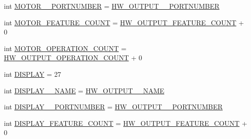 \begin{DoxyCompactItemize}
\item 
int \hyperlink{interfaceshootingmachineemfmodel_1_1_shootingmachineemfmodel_package_ad27731e242f79b59628ab647963d0eaf}{M\-O\-T\-O\-R\-\_\-\-\_\-\-P\-O\-R\-T\-N\-U\-M\-B\-E\-R} = \hyperlink{interfaceshootingmachineemfmodel_1_1_shootingmachineemfmodel_package_a2407c3a47af8c06cbb4aabb70268949d}{H\-W\-\_\-\-O\-U\-T\-P\-U\-T\-\_\-\-\_\-\-P\-O\-R\-T\-N\-U\-M\-B\-E\-R}
\item 
int \hyperlink{interfaceshootingmachineemfmodel_1_1_shootingmachineemfmodel_package_ad99b3e06abce5503e6e3ef77c5058b72}{M\-O\-T\-O\-R\-\_\-\-F\-E\-A\-T\-U\-R\-E\-\_\-\-C\-O\-U\-N\-T} = \hyperlink{interfaceshootingmachineemfmodel_1_1_shootingmachineemfmodel_package_aefdcd2b83d8884b60a471a861146421f}{H\-W\-\_\-\-O\-U\-T\-P\-U\-T\-\_\-\-F\-E\-A\-T\-U\-R\-E\-\_\-\-C\-O\-U\-N\-T} + 0
\item 
int \hyperlink{interfaceshootingmachineemfmodel_1_1_shootingmachineemfmodel_package_ace2679b1f358734d8936489db75b5a35}{M\-O\-T\-O\-R\-\_\-\-O\-P\-E\-R\-A\-T\-I\-O\-N\-\_\-\-C\-O\-U\-N\-T} = \hyperlink{interfaceshootingmachineemfmodel_1_1_shootingmachineemfmodel_package_a911c6904fe8043130ce479d0e1d2e0b6}{H\-W\-\_\-\-O\-U\-T\-P\-U\-T\-\_\-\-O\-P\-E\-R\-A\-T\-I\-O\-N\-\_\-\-C\-O\-U\-N\-T} + 0
\item 
int \hyperlink{interfaceshootingmachineemfmodel_1_1_shootingmachineemfmodel_package_a5192d9d2f65949d1265252867e80bb70}{D\-I\-S\-P\-L\-A\-Y} = 27
\item 
int \hyperlink{interfaceshootingmachineemfmodel_1_1_shootingmachineemfmodel_package_a285c9b72184c985918ffefe121eabcd9}{D\-I\-S\-P\-L\-A\-Y\-\_\-\-\_\-\-N\-A\-M\-E} = \hyperlink{interfaceshootingmachineemfmodel_1_1_shootingmachineemfmodel_package_a82c44c284e4ef61163abe3704089bfad}{H\-W\-\_\-\-O\-U\-T\-P\-U\-T\-\_\-\-\_\-\-N\-A\-M\-E}
\item 
int \hyperlink{interfaceshootingmachineemfmodel_1_1_shootingmachineemfmodel_package_a46895963de9d19faad3fa3c2f0e20e5d}{D\-I\-S\-P\-L\-A\-Y\-\_\-\-\_\-\-P\-O\-R\-T\-N\-U\-M\-B\-E\-R} = \hyperlink{interfaceshootingmachineemfmodel_1_1_shootingmachineemfmodel_package_a2407c3a47af8c06cbb4aabb70268949d}{H\-W\-\_\-\-O\-U\-T\-P\-U\-T\-\_\-\-\_\-\-P\-O\-R\-T\-N\-U\-M\-B\-E\-R}
\item 
int \hyperlink{interfaceshootingmachineemfmodel_1_1_shootingmachineemfmodel_package_a76c970461ac665b36f359adb602c1802}{D\-I\-S\-P\-L\-A\-Y\-\_\-\-F\-E\-A\-T\-U\-R\-E\-\_\-\-C\-O\-U\-N\-T} = \hyperlink{interfaceshootingmachineemfmodel_1_1_shootingmachineemfmodel_package_aefdcd2b83d8884b60a471a861146421f}{H\-W\-\_\-\-O\-U\-T\-P\-U\-T\-\_\-\-F\-E\-A\-T\-U\-R\-E\-\_\-\-C\-O\-U\-N\-T} + 0

\end{DoxyCompactItemize}
